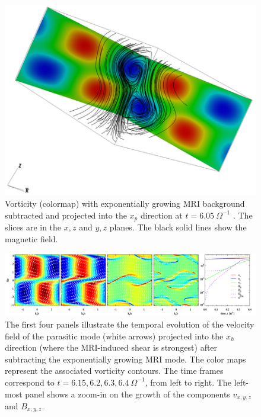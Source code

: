 \documentclass[]{emulateapj}
\begin{document}
\begin{figure}[t]
\begin{center}
\includegraphics[width=0.45 \textwidth]{f6.png}
\caption{
Vorticity (colormap) with exponentially growing MRI background subtracted 
and projected into the $x_p$  direction  at $t=6.05~\Omega^{-1}$ . 
The slices are in the $x,z$ and $y,z$ planes.
The black solid lines show the magnetic field.
}
\label{3dprojectedvorticity}
\end{center}
\end{figure} 

\begin{figure}[t]
\begin{center}
\includegraphics[width=0.99 \textwidth]{f7.png}
\caption{
The first four panels illustrate the temporal evolution of the velocity field 
of the parasitic mode (white arrows) projected into the $x_h$ direction 
(where the MRI-induced shear is strongest) after subtracting the exponentially 
growing MRI mode. The color maps represent the associated vorticity contours.
The time frames correspond to  $t=6.15,6.2,6.3,6.4 ~ \Omega^{-1}$, from left to right. 
The left-most panel shows a zoom-in on the growth of the components
$v_{x,y,z}$ and $B_{x,y,z}$.
}
\label{2dcutof3dprojectedvorticity}
\end{center}
\end{figure}
\end{document}
